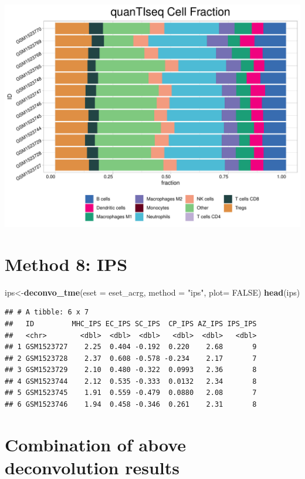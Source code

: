 \documentclass[
  12pt,
]{book}
\newenvironment{Shaded}{\begin{snugshade}}{\end{snugshade}}
\newcommand{\AttributeTok}[1]{\textcolor[rgb]{0.13,0.29,0.53}{#1}}
\newcommand{\ConstantTok}[1]{\textcolor[rgb]{0.56,0.35,0.01}{#1}}
\newcommand{\FunctionTok}[1]{\textcolor[rgb]{0.13,0.29,0.53}{\textbf{#1}}}
\newcommand{\NormalTok}[1]{#1}
\newcommand{\OtherTok}[1]{\textcolor[rgb]{0.56,0.35,0.01}{#1}}
\newcommand{\StringTok}[1]{\textcolor[rgb]{0.31,0.60,0.02}{#1}}
\theoremstyle{definition}
\theoremstyle{definition}
\theoremstyle{definition}
\theoremstyle{definition}
\theoremstyle{remark}
\begin{document}
\includegraphics{_main_files/figure-latex/unnamed-chunk-70-1.pdf}

\hypertarget{method-8-ips}{%
\section{Method 8: IPS}\label{method-8-ips}}

\begin{Shaded}
\begin{Highlighting}[]
\NormalTok{ips}\OtherTok{\textless{}{-}}\FunctionTok{deconvo\_tme}\NormalTok{(}\AttributeTok{eset =}\NormalTok{ eset\_acrg, }\AttributeTok{method =} \StringTok{"ips"}\NormalTok{, }\AttributeTok{plot=} \ConstantTok{FALSE}\NormalTok{)}
\FunctionTok{head}\NormalTok{(ips)}
\end{Highlighting}
\end{Shaded}

\begin{verbatim}
## # A tibble: 6 x 7
##   ID         MHC_IPS EC_IPS SC_IPS  CP_IPS AZ_IPS IPS_IPS
##   <chr>        <dbl>  <dbl>  <dbl>   <dbl>  <dbl>   <dbl>
## 1 GSM1523727    2.25  0.404 -0.192  0.220    2.68       9
## 2 GSM1523728    2.37  0.608 -0.578 -0.234    2.17       7
## 3 GSM1523729    2.10  0.480 -0.322  0.0993   2.36       8
## 4 GSM1523744    2.12  0.535 -0.333  0.0132   2.34       8
## 5 GSM1523745    1.91  0.559 -0.479  0.0880   2.08       7
## 6 GSM1523746    1.94  0.458 -0.346  0.261    2.31       8
\end{verbatim}

\hypertarget{combination-of-above-deconvolution-results}{%
\section{Combination of above deconvolution results}\label{combination-of-above-deconvolution-results}}
\end{document}
